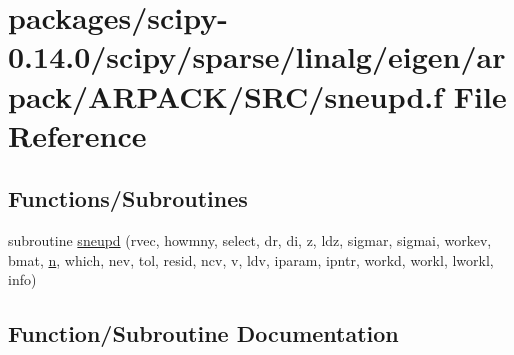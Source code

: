 \hypertarget{sneupd_8f}{}\section{packages/scipy-\/0.14.0/scipy/sparse/linalg/eigen/arpack/\+A\+R\+P\+A\+C\+K/\+S\+R\+C/sneupd.f File Reference}
\label{sneupd_8f}
\subsection*{Functions/\+Subroutines}
\begin{DoxyCompactItemize}
\item 
subroutine \hyperlink{sneupd_8f_a1565c973f363f64d45594e40fb4f86c4}{sneupd} (rvec, howmny, select, dr, di, z, ldz, sigmar, sigmai, workev, bmat, \hyperlink{indexexpr_8h_ab427e2e2b4d6cec55fa088ea2a692ace}{n}, which, nev, tol, resid, ncv, v, ldv, iparam, ipntr, workd, workl, lworkl, info)
\end{DoxyCompactItemize}


\subsection{Function/\+Subroutine Documentation}
\hypertarget{sneupd_8f_a1565c973f363f64d45594e40fb4f86c4}{}
